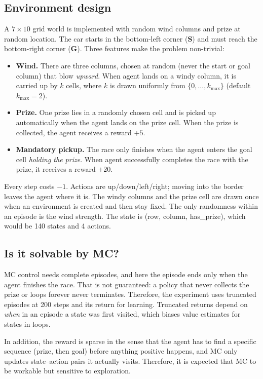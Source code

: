 \documentclass{article}
\begin{document}
\subsection{Environment design}
A $7\times10$ grid world is implemented with random wind columns and prize at
random location. The car starts in the bottom-left corner (\textbf{S}) and must
reach the bottom-right corner
(\textbf{G}). Three features make the problem non-trivial:
\begin{itemize}
\item \textbf{Wind.} There are three columns, chosen at random (never the start
or goal column) that blow \emph{upward}. When agent lands on a windy column, it
is carried up by $k$ cells, where $k$ is drawn uniformly from
$\{0,\dots,k_{\max}\}$ (default $k_{\max}=2$).
\item \textbf{Prize.} One prize lies in a randomly chosen cell and is picked up
automatically when the agent lands on the prize cell. When the prize is
collected, the agent receives a reward $+5$.
\item \textbf{Mandatory pickup.} The race only finishes when the agent enters
the goal cell \emph{holding the prize}. When agent successfully completes the
race with the prize, it receives a reward $+20$.
\end{itemize}
Every step costs $-1$. Actions are up/down/left/right; moving into the border
leaves the agent where it is. The windy columns and the prize cell are drawn
once when an environment is created and then stay fixed.
The only randomness within an episode is the wind strength. The state is (row,
column, has\_prize), which would be 140 states and 4 actions.

\subsection{Is it solvable by MC?}
MC control needs complete episodes, and here the episode ends only when the
agent finishes the race. That is not guaranteed: a policy that never collects
the prize or loops forever never terminates. Therefore, the experiment uses
truncated episodes at 200 steps and its return for learning. Truncated returns
depend on \emph{when} in an episode a state was first visited, which biases
value estimates for states in loops.

In addition, the reward is sparse in the sense that the agent has to find a
specific sequence (prize, then goal) before anything positive happens, and MC
only updates state--action pairs it actually visits. Therefore, it is expected
that MC to be workable but sensitive to exploration.
\end{document}
